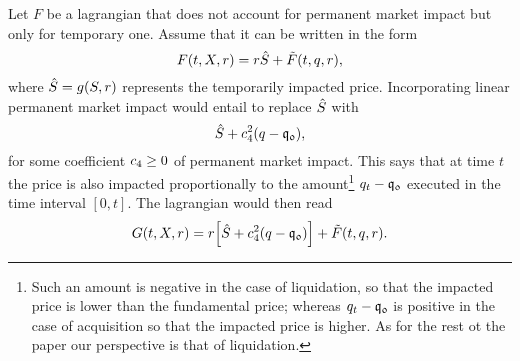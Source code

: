 \documentclass[10pt,a4paper]{article}
\begin{document}
	Let $F$ be a lagrangian that does not account for permanent market impact but only for temporary one. Assume that it can be written in the form 
	\begin{equation}\label{eq.lagrangianWithOnlyInstantaneousImpact}
	F(t,X,r)= r\hat{S} +\tilde{F}(t,q,r),
	\end{equation}
	where $\hat{S}=g(S,r)$ represents the temporarily impacted price. Incorporating linear permanent market impact would entail to replace $\hat{S}$ with 
	\begin{equation*}
	\hat{S} + c_{4}^{2} (q - \mathfrak{q_0}),
	\end{equation*}
	for some coefficient $c_{4}\geq 0$ of permanent market impact. This says that at time $t$ the  price is also impacted proportionally to the amount\footnote{Such an amount is negative in the case of liquidation, so that the impacted price is lower than the fundamental price; whereas $q_t-\mathfrak{q_0}$ is positive in the case of acquisition so that the impacted price is higher. As for the rest ot the paper our perspective is that of liquidation.} $q_t - \mathfrak{q_0}$ executed in the time interval $[0,t]$. The lagrangian would then read 
	\begin{equation}\label{eq.lagrangianWithAdditivePermanentImpact}
	G (t,X,r) =
	 r\Big[\hat{S}+ c_{4}^{2} (q - \mathfrak{q_0})\Big] +\tilde{F}(t,q,r).
	\end{equation}
	
\end{document}
